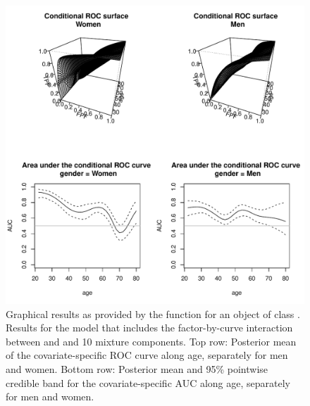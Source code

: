 \begin{figure}[ht!]
\begin{center}
\includegraphics[width=14cm]{cROC_bnp.pdf}
\end{center}
\caption{Graphical results as provided by the  function for an object of class . Results for the model that includes the factor-by-curve interaction between  and  and 10 mixture components. Top row: Posterior mean of the covariate-specific ROC curve along age, separately for men and women. Bottom row: Posterior mean and 95\% pointwise credible band for the covariate-specific AUC along age, separately for men and women.}
\label{cROC_bnp_plot}
\end{figure}

